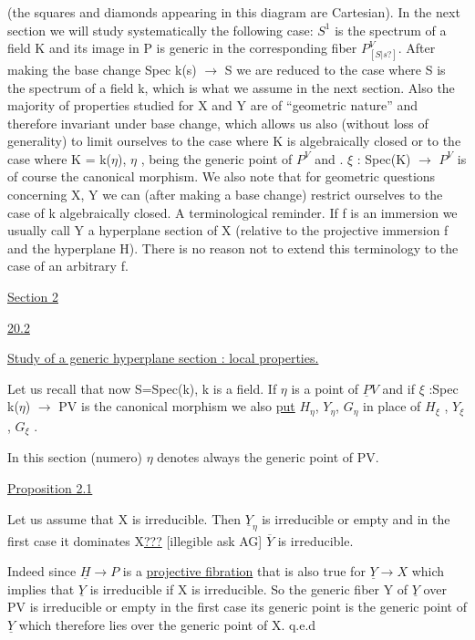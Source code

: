 \documentclass[11pt]{article}
\newcommand{\scanpage}[1]{\par\bigskip\noindent{\small\sffamily[scan #1]}\par}
\newcommand{\mspage}[1]{{\small\sffamily[p.\,#1]}}
\newcommand{\uline}[1]{\underline{#1}}
\newcommand{\unsure}[1]{[#1?]}
\begin{document}
(the squares and diamonds appearing in this diagram are
Cartesian). In the next section we will study systematically the
following case: $S^{1}$ is the spectrum of a field K and its image in P
is generic in the corresponding fiber $P^{V}_{\unsure{S|s}}$. After making the base
change Spec k(s) $\rightarrow$ S we are reduced to the case where S is the
spectrum of a field k, which is what we assume in the next
section. Also the majority of properties studied for X and Y are
of ``geometric nature'' and therefore invariant under base change,
which allows us also (without loss of generality) to limit
ourselves to the case where K is algebraically closed or to the
case where K = k($\eta$), $\eta$ , being the generic point of $P^{V}$ and . $\xi$ :
Spec(K) $\rightarrow$ $P^{V}$ is of course the canonical morphism. We also note
that for geometric questions concerning X, Y we can (after making
a base change) restrict ourselves to the case of k algebraically
closed. A terminological reminder. If f is an immersion we
usually call Y a hyperplane section of X (relative to the
projective immersion f and the hyperplane H). There is no reason
not to extend this terminology to the case of an arbitrary f.

\clearpage
\scanpage{24/9}
\mspage{9}

\uline{Section 2}

\uline{20.2}

\uline{Study of a generic hyperplane section : local properties.}

Let us recall that now S=Spec(k), k is a field.  If $\eta$ is a
point of $\underline{P}V$ and if $\xi$ :Spec k($\eta$) $\rightarrow$ PV is the canonical morphism we
also \uline{put} $H_{\eta}$, $Y_{\eta}$, $G_{\eta}$ in place of $H_{\xi}$ , $Y_{\xi}$ , $G_{\xi}$ .

In this section (numero) $\eta$ denotes always the generic point
of PV.

\uline{Proposition 2.1}

Let us assume that X is irreducible.  Then $\underline{Y}_{\eta}$ is irreducible
or empty and in the first case it dominates X\uline{???} [illegible ask
AG] $\overline{Y}$ is irreducible.

Indeed since $\underline{H} \rightarrow P$ is a \uline{projective fibration} that is also
true for $\underline{Y} \rightarrow X$ which implies that $\underline{Y}$ is irreducible if X is
irreducible.  So the generic fiber Y of $\underline{Y}$ over PV is irreducible or
empty in the first case its generic point is the generic point of
$\underline{Y}$ which therefore lies over the generic point of X.  q.e.d
\end{document}

